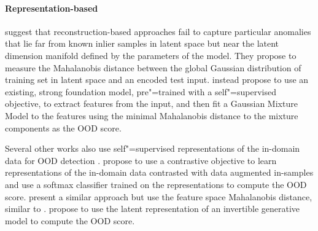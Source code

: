 \paragraph{Representation-based}
%
\textcite{denouden_improving_2018} suggest that reconstruction-based approaches fail to capture particular anomalies that lie far from known inlier samples in latent space but near the latent dimension manifold defined by the parameters of the model. They propose to measure the Mahalanobis distance between the global Gaussian distribution of training set in latent space and an encoded test input. 
\textcite{xiao_we_2021} instead propose to use an existing, strong foundation model, pre"=trained with a self"=supervised objective, to extract features from the input, and then fit a Gaussian Mixture Model to the features using the minimal Mahalanobis distance to the mixture components as the OOD score.

Several other works also use self"=supervised representations of the in-domain data for OOD detection \parencite{hendrycks_using_2019,bergman_classificationbased_2020}. 
\textcite{tack_csi_2020} propose to use a contrastive objective to learn representations of the in-domain data contrasted with data augmented in-samples and use a softmax classifier trained on the representations to compute the OOD score. \textcite{sehwag_ssd_2021} present a similar approach but use the feature space Mahalanobis distance, similar to \textcite{denouden_improving_2018}. 
\textcite{ahmadian_likelihoodfree_2021} propose to use the latent representation of an invertible generative model to compute the OOD score.


